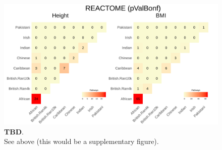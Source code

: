 \documentclass[12pt, a4paper]{article}
\begin{document}
\begin{figure}[htbp]
\centering
\includegraphics[scale=.225]{Images/Supp/InterPath_Supp_Figure_Heatplots_REACTOME_vs1.png}
\caption[TBD]{\textbf{TBD}. \\ See above (this would be a supplementary figure).}
\label{InterPath-Supp-Figure-Heatplots-REACTOME}
\end{figure}
\end{document}
